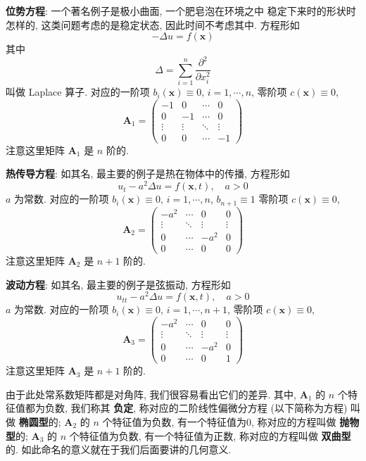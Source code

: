 \documentclass[UTF8]{book}
\begin{document}
\begin{enumerate}
    \textbf{位势方程}: 一个著名例子是极小曲面, 一个肥皂泡在环境之中
    稳定下来时的形状时怎样的, 这类问题考虑的是稳定状态, 因此时间不考虑其中. 
    方程形如 
    $$ -\Delta u = f(\boldsymbol{x}) $$
    其中 
    $$\Delta = \sum_{i=1}^{n} \frac{\partial^2}{\partial x_i^2} $$ 
    叫做 Laplace 算子. 
    对应的一阶项 $ b_i(\boldsymbol{x})\equiv 0,\,i=1,\cdots,n $, 
    零阶项 $ c(\boldsymbol{x}) \equiv 0 $, 
    $$ 
    \boldsymbol{A}_1 = 
    \begin{pmatrix}
        -1 & 0 & \cdots & 0  \\
        0 & -1 & \cdots & 0  \\
        \vdots & \vdots & \ddots & \vdots \\
        0 & 0 & \cdots & -1  
    \end{pmatrix}
    $$
    注意这里矩阵 $ \boldsymbol{A}_1$ 是 $n$ 阶的.

    \textbf{热传导方程}: 如其名, 最主要的例子是热在物体中的传播, 
    方程形如 
    $$ u_t-a^2\Delta u = f(\boldsymbol{x},t),\quad a>0 $$
    $a$ 为常数. 对应的一阶项 $ b_i(\boldsymbol{x})\equiv 0,\,i=1,\cdots,n $,
    $b_{n+1} \equiv 1$  
    零阶项 $ c(\boldsymbol{x}) \equiv 0 $, 
    $$ 
    \boldsymbol{A}_2 = 
    \begin{pmatrix}
        -a^2 & \cdots & 0 & 0 \\
        \vdots & \ddots & \vdots &\vdots \\
        0 & \cdots & -a^2 & 0 \\
        0 & \cdots & 0 & 0 
    \end{pmatrix}
    $$
    注意这里矩阵 $ \boldsymbol{A}_2$ 是 $n+1$ 阶的. 
    
    \textbf{波动方程}: 如其名, 最主要的例子是弦振动, 
    方程形如 
    $$ u_{tt}-a^2\Delta u = f(\boldsymbol{x},t),\quad a>0 $$
    $a$ 为常数. 对应的一阶项 $ b_i(\boldsymbol{x})\equiv 0,\,i=1,\cdots,n+1 $,
    零阶项 $ c(\boldsymbol{x}) \equiv 0 $, 
    $$ 
    \boldsymbol{A}_3 = 
    \begin{pmatrix}
        -a^2 & \cdots & 0 & 0 \\
        \vdots & \ddots & \vdots &\vdots \\
        0 & \cdots & -a^2 & 0 \\
        0 & \cdots & 0 & 1 
    \end{pmatrix}
    $$
    注意这里矩阵 $ \boldsymbol{A}_3$ 是 $n+1$ 阶的. 
    
    由于此处常系数矩阵都是对角阵, 我们很容易看出它们的差异. 
    其中, $\boldsymbol{A}_1$ 的 $n$ 个特征值都为负数, 我们称其 \textbf{负定}, 
    称对应的二阶线性偏微分方程 (以下简称为方程) 叫做 \textbf{椭圆型}的; 
    $\boldsymbol{A}_2$ 的 $n$ 个特征值为负数, 有一个特征值为0, 
    称对应的方程叫做 \textbf{抛物型}的; 
    $\boldsymbol{A}_3$ 的 $n$ 个特征值为负数, 有一个特征值为正数, 
    称对应的方程叫做 \textbf{双曲型}的. 
    如此命名的意义就在于我们后面要讲的几何意义.  


\end{enumerate}
\end{document}
